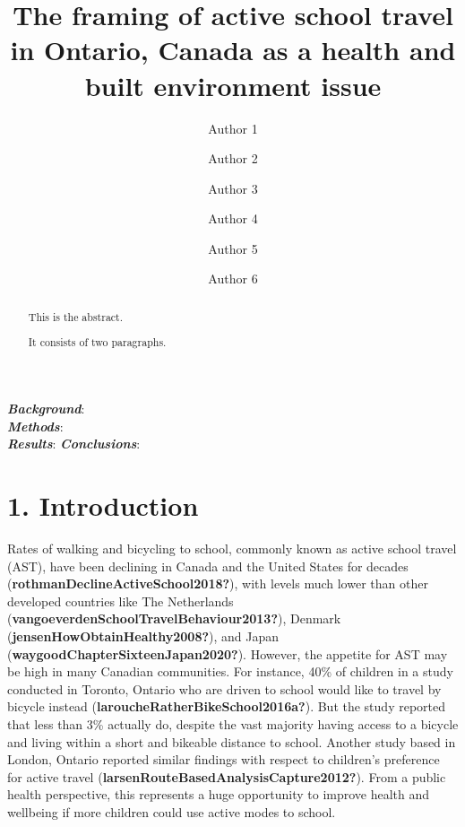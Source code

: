 \documentclass[]{elsarticle} %
\begin{document}
\begin{frontmatter}

  \title{The framing of active school travel in Ontario, Canada as a
health and built environment issue}
    \author[Some Department]{Author 1}
    \author[Some Department]{Author 2}
    \author[Another University]{Author 3}
    \author[Some Institute]{Author 4}
    \author[Some University]{Author 5}
    \author[Some Department]{Author 6}
      \address[Some Department]{Department, Street, City, Province,
Postal Code}
    \address[Another University]{Department, Street, City, Province,
Postal Code}
    \address[Some Institute]{Street, City, Province, Postal Code}
    \address[Some University]{Department, Street, City, Province, Postal
Code}
  
  \begin{abstract}
  This is the abstract.

  It consists of two paragraphs.
  \end{abstract}
  
 \end{frontmatter}

\textbf{\emph{Background}}:\\
\textbf{\emph{Methods}}:\\
\textbf{\emph{Results}}: \textbf{\emph{Conclusions}}:

\newpage

\hypertarget{introduction}{%
\section{1. Introduction}\label{introduction}}

Rates of walking and bicycling to school, commonly known as active
school travel (AST), have been declining in Canada and the United States
for decades (\textbf{rothmanDeclineActiveSchool2018?}), with levels much
lower than other developed countries like The Netherlands
(\textbf{vangoeverdenSchoolTravelBehaviour2013?}), Denmark
(\textbf{jensenHowObtainHealthy2008?}), and Japan
(\textbf{waygoodChapterSixteenJapan2020?}). However, the appetite for
AST may be high in many Canadian communities. For instance, 40\% of
children in a study conducted in Toronto, Ontario who are driven to
school would like to travel by bicycle instead
(\textbf{laroucheRatherBikeSchool2016a?}). But the study reported that
less than 3\% actually do, despite the vast majority having access to a
bicycle and living within a short and bikeable distance to school.
Another study based in London, Ontario reported similar findings with
respect to children's preference for active travel
(\textbf{larsenRouteBasedAnalysisCapture2012?}). From a public health
perspective, this represents a huge opportunity to improve health and
wellbeing if more children could use active modes to school.
\end{document}
